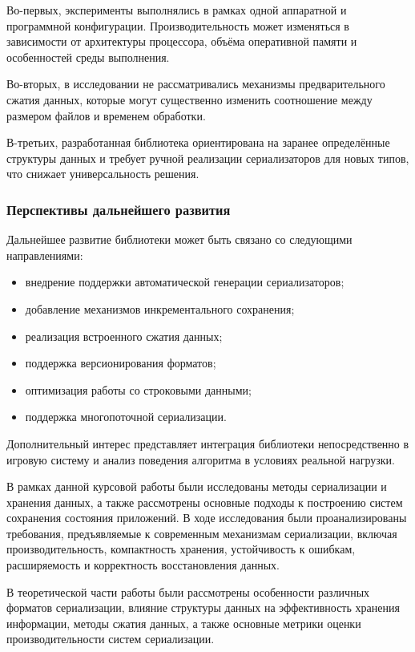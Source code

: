 \documentclass[coursework]{SCWorks}
\begin{document}
Во-первых, эксперименты выполнялись в рамках одной аппаратной и программной конфигурации. Производительность может изменяться в зависимости от архитектуры процессора, объёма оперативной памяти и особенностей среды выполнения.

Во-вторых, в исследовании не рассматривались механизмы предварительного сжатия данных, которые могут существенно изменить соотношение между размером файлов и временем обработки.

В-третьих, разработанная библиотека ориентирована на заранее определённые структуры данных и требует ручной реализации сериализаторов для новых типов, что снижает универсальность решения.

\subsubsection{Перспективы дальнейшего развития}

Дальнейшее развитие библиотеки может быть связано со следующими направлениями:
\begin{itemize}
    \item внедрение поддержки автоматической генерации сериализаторов;
    \item добавление механизмов инкрементального сохранения;
    \item реализация встроенного сжатия данных;
    \item поддержка версионирования форматов;
    \item оптимизация работы со строковыми данными;
    \item поддержка многопоточной сериализации.
\end{itemize}

Дополнительный интерес представляет интеграция библиотеки непосредственно в игровую систему и анализ поведения алгоритма в условиях реальной нагрузки.

\conclusion

В рамках данной курсовой работы были исследованы методы сериализации и хранения данных, а также рассмотрены основные подходы к построению систем сохранения состояния приложений. В ходе исследования были проанализированы требования, предъявляемые к современным механизмам сериализации, включая производительность, компактность хранения, устойчивость к ошибкам, расширяемость и корректность восстановления данных.

В теоретической части работы были рассмотрены особенности различных форматов сериализации, влияние структуры данных на эффективность хранения информации, методы сжатия данных, а также основные метрики оценки производительности систем сериализации. 
\end{document}

